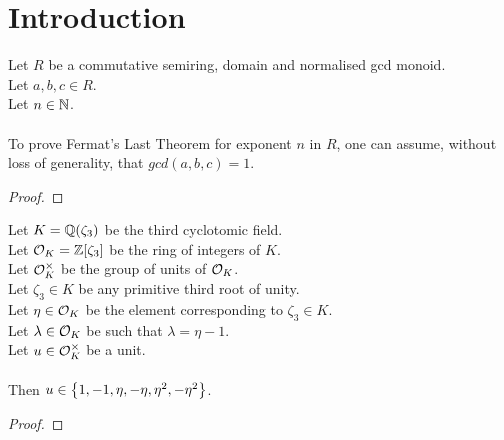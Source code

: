 \chapter{Introduction}


\begin{lemma}
    \label{lmm:fermatLastTheoremWith_of_fermatLastTheoremWith_coprime}
    \leanok
    Let $R$ be a commutative semiring, domain and normalised gcd monoid.\\%
    Let $a, b, c \in R$. \\
    Let $n \in \mathbb{N}$. \\\\
    To prove Fermat's Last Theorem for exponent $n$ in $R$,
    one can assume, without loss of generality, that $gcd(a,b,c)=1$.
\end{lemma}
\begin{proof}
    \leanok
\end{proof}

\begin{theorem}
    \label{thm:mem}
    \leanok
    Let $K = \mathbb{Q}(\zeta_3)$ be the third cyclotomic field. \\
    Let $\mathcal{O}_K = \mathbb{Z}[\zeta_3]$ be the ring of integers of $K$. \\
    Let $\mathcal{O}^\times_K$ be the group of units of $\mathcal{O}_K$. \\
    Let $\zeta_3 \in K$ be any primitive third root of unity. \\
    Let $\eta \in \mathcal{O}_K$ be the element corresponding to $\zeta_3 \in K$. \\
    Let $\lambda \in \mathcal{O}_K$ be such that $\lambda = \eta -1$. \\
    Let $u \in \mathcal{O}^\times_K$ be a unit. \\\\
    Then $u \in \left\{1, -1, \eta, -\eta, \eta^2, -\eta^2\right\}$.
\end{theorem}
\begin{proof}
    \leanok
\end{proof}

